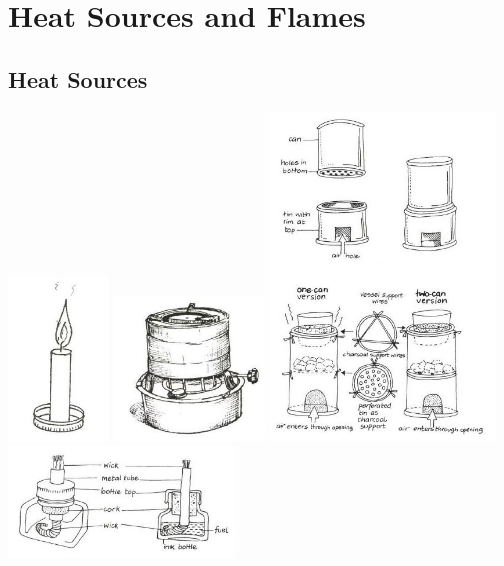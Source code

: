 \section{Heat Sources and Flames}

\begin{multicols}{2}




\subsection{Heat Sources}

\begin{center}
\includegraphics[width=0.2\textwidth]{./img/source/candle-burner.jpg}
\includegraphics[width=0.3\textwidth]{./img/source/kerosene-burner.jpg}
\includegraphics[width=0.45\textwidth]{./img/vso/charcoal-burner.jpg}
\includegraphics[width=0.45\textwidth]{./img/vso/spirit-burner.jpg}
\end{center}


\end{multicols}
